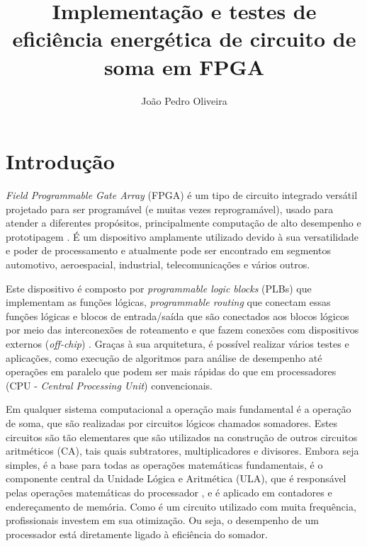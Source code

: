 \documentclass[12pt,consuni]{uftpibic}
\title{Implementação e testes de eficiência energética de circuito de soma em FPGA}
\author{João Pedro Oliveira}{Barbosa}
\begin{document}
\maketitle

\vspace{1cm}
\setlength{\parindent}{1.5cm}
\chapter{Introdução}

\textit{Field Programmable Gate Array} (FPGA) é um tipo de circuito integrado versátil projetado para ser programável (e muitas vezes reprogramável), usado para atender a diferentes propósitos, principalmente computação de alto desempenho e prototipagem \cite{ibm_fpga_2024}. É um dispositivo amplamente utilizado devido à sua versatilidade e poder de processamento e atualmente pode ser encontrado em segmentos automotivo, aeroespacial, industrial, telecomunicações e vários outros.

Este dispositivo é composto por \textit{programmable logic blocks} (PLBs) que implementam as funções lógicas, \textit{programmable routing} que conectam essas funções lógicas e blocos de entrada/saída que são conectados aos blocos lógicos por meio das interconexões de roteamento e que fazem conexões com dispositivos externos (\textit{off-chip}) \cite{Farooq2012}. Graças à sua arquitetura, é possível realizar vários testes e aplicações, como execução de algoritmos para análise de desempenho até operações em paralelo que podem ser mais rápidas do que em processadores (CPU - \textit{Central Processing Unit}) convencionais.

Em qualquer sistema computacional a operação mais fundamental é a operação de soma, que são realizadas por circuitos lógicos chamados somadores. Estes circuitos são tão elementares que são utilizados na construção de outros circuitos aritméticos (CA), tais quais subtratores, multiplicadores e divisores. Embora seja simples, é a base para todas as operações matemáticas fundamentais, é o componente central da Unidade Lógica e Aritmética (ULA), que é responsável pelas operações matemáticas do processador \cite{toccisistemas}, e é aplicado em contadores e endereçamento de memória. Como é um circuito utilizado com muita frequência, profissionais investem em sua otimização. Ou seja, o desempenho de um processador está diretamente ligado à eficiência do somador.

\vspace{1.5cm}
\end{document}
